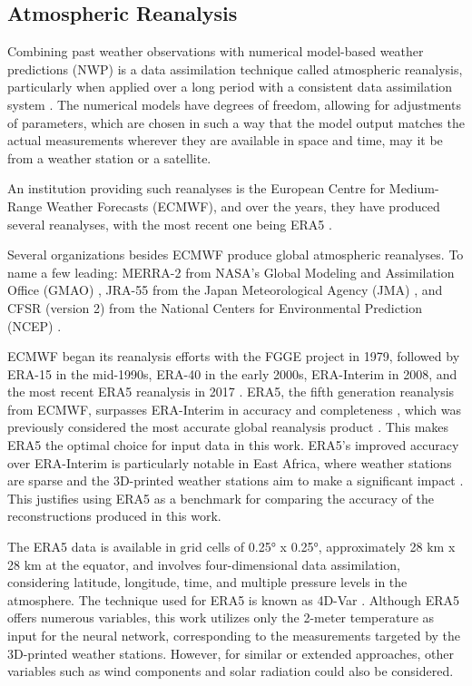 \subsection{Atmospheric Reanalysis}
 
Combining past weather observations with numerical model-based weather predictions (NWP)
is a data assimilation technique called atmospheric reanalysis, particularly when applied over a long period with a consistent data assimilation system \cite{Poli2016ERA20C, ECMWF2020dataassimilation}. The numerical models have degrees of freedom, allowing for adjustments of parameters, which are chosen in such a way that the model output matches the actual measurements wherever they are available in space and time, may it be from a weather station or a satellite.

An institution providing such reanalyses is the European Centre for Medium-Range Weather Forecasts (ECMWF), and over the years, they have produced several reanalyses, with the most recent one being ERA5 \cite{Hersbach2020ERA5quality}.

Several organizations besides ECMWF produce global atmospheric reanalyses. To name a few leading: MERRA-2 from NASA's Global Modeling and Assimilation Office (GMAO) \cite{Gelaro2017}, JRA-55 from the Japan Meteorological Agency (JMA) \cite{Kobayashi2015}, and CFSR (version 2) from the National Centers for Environmental Prediction (NCEP) \cite{Saha2014}.

ECMWF began its reanalysis efforts with the FGGE project in 1979, followed by ERA-15 in the mid-1990s, ERA-40 in the early 2000s, ERA-Interim in 2008, and the most recent ERA5 reanalysis in 2017 \cite{Hersbach2020ERA5quality}. ERA5, the fifth generation reanalysis from ECMWF, surpasses ERA-Interim in accuracy and completeness \cite{Hersbach2020ERA5quality}, which was previously considered the most accurate global reanalysis product \cite{Beck2019interimWasBest}. This makes ERA5 the optimal choice for input data in this work. ERA5's improved accuracy over ERA-Interim is particularly notable in East Africa, where weather stations are sparse and the 3D-printed weather stations aim to make a significant impact \cite{Gleixner2020ERA5africa}. This justifies using ERA5 as a benchmark for comparing the accuracy of the reconstructions produced in this work.

The ERA5 data is available in grid cells of 0.25° x 0.25°, approximately 28 km x 28 km at the equator, and involves four-dimensional data assimilation, considering latitude, longitude, time, and multiple pressure levels in the atmosphere. The technique used for ERA5 is known as 4D-Var \cite{era5}. Although ERA5 offers numerous variables, this work utilizes only the 2-meter temperature as input for the neural network, corresponding to the measurements targeted by the 3D-printed weather stations. However, for similar or extended approaches, other variables such as wind components and solar radiation could also be considered.